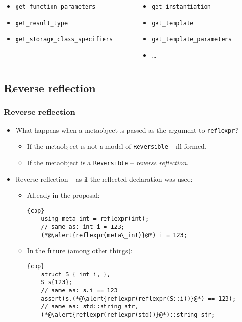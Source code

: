\documentclass[compress,table,xcolor=table]{beamer}
\begin{document}
\begin{frame}
\begin{columns}
\begin{column}{0.45\textwidth}
\begin{itemize}
      \item \texttt{get\_function\_parameters}
      \item \texttt{get\_result\_type}
      \item \texttt{get\_storage\_class\_specifiers}
      \end{itemize}
    \end{column}
    \begin{column}{0.40\textwidth}
      \begin{itemize}
      \item \texttt{get\_instantiation}
      \item \texttt{get\_template}
      \item \texttt{get\_template\_parameters}
      \item \ldots
      \end{itemize}
    \end{column}
  \end{columns}
\end{frame}

\subsection{Reverse reflection}
\begin{frame}[fragile]
\frametitle{Reverse reflection}
  \small
  \begin{itemize}
    \item What happens when a metaobject is passed as the argument
      to \texttt{reflexpr}?
    \begin{itemize}
      \item If the metaobject is not a model of \texttt{Reversible} -- ill-formed.
      \item If the metaobject is a \texttt{Reversible} -- {\em reverse reflection}.
    \end{itemize}
    \item Reverse reflection -- as if the reflected declaration was used:
    \begin{itemize}
      \item Already in the proposal:
      \begin{lstlisting}{cpp}
	using meta_int = reflexpr(int);
	// same as: int i = 123;
	(*@\alert{reflexpr(meta\_int)}@*) i = 123;
      \end{lstlisting}
      \item In the future (among other things):
      \begin{lstlisting}{cpp}
	struct S { int i; };
	S s{123};
	// same as: s.i == 123
	assert(s.(*@\alert{reflexpr(reflexpr(S::i))}@*) == 123);
	// same as: std::string str;
	(*@\alert{reflexpr(reflexpr(std))}@*)::string str;
      \end{lstlisting}
    \end{itemize}
  \end{itemize}
\end{frame}
\end{document}
